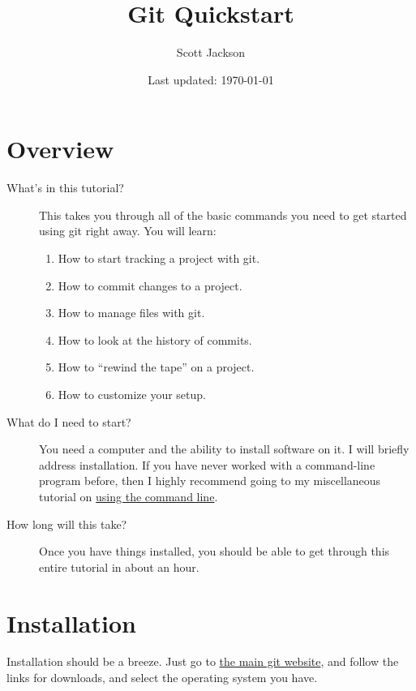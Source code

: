 \documentclass[11pt]{article}
\title{Git Quickstart}
\author{Scott Jackson}
\date{Last updated: \today}
\begin{document}
\maketitle

\setcounter{tocdepth}{3}
\tableofcontents
\vspace*{1cm}


\section{Overview}
\label{sec-1}

\begin{description}
\item[What's in this tutorial?] This takes you through all of the basic commands you need to get started using git right away. You will learn:
\begin{enumerate}
\item How to start tracking a project with git.
\item How to commit changes to a project.
\item How to manage files with git.
\item How to look at the history of commits.
\item How to ``rewind the tape'' on a project.
\item How to customize your setup.
\end{enumerate}
\item[What do I need to start?] You need a computer and the ability to install software on it. I will briefly address installation.  If you have never worked with a command-line program before, then I highly recommend going to my miscellaneous tutorial on \href{https://github.com/shoestringpsycholing/rrr_tools/misc_tutorials/}{using the command line}.
\item[How long will this take?] Once you have things installed, you should be able to get through this entire tutorial in about an hour.
\end{description}
\section{Installation}
\label{sec-2}

Installation should be a breeze. Just go to \href{http://git-scm.com}{the main git website}, and follow the links for downloads, and select the operating system you have.
\end{document}
